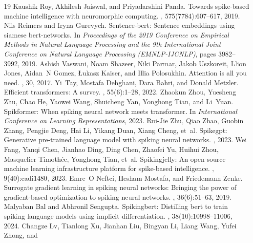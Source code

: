 \documentclass[11pt, conference, compsoc, twoside]{IEEEtran}
\begin{document}
\begin{thebibliography}{19}
Kaushik Roy, Akhilesh Jaiswal, and Priyadarshini Panda.
\newblock Towards spike-based machine intelligence with neuromorphic computing.
, 575(7784):607--617, 2019.
Nils Reimers and Iryna Gurevych.
\newblock Sentence-bert: Sentence embeddings using siamese bert-networks.
\newblock In {\em Proceedings of the 2019 Conference on Empirical Methods in
  Natural Language Processing and the 9th International Joint Conference on
  Natural Language Processing (EMNLP-IJCNLP)}, pages 3982--3992, 2019.
Ashish Vaswani, Noam Shazeer, Niki Parmar, Jakob Uszkoreit, Llion Jones,
  Aidan~N Gomez, {\L}ukasz Kaiser, and Illia Polosukhin.
\newblock Attention is all you need.
, 30, 2017.
Yi~Tay, Mostafa Dehghani, Dara Bahri, and Donald Metzler.
\newblock Efficient transformers: A survey.
, 55(6):1--28, 2022.
Zhaokun Zhou, Yuesheng Zhu, Chao He, Yaowei Wang, Shuicheng Yan, Yonghong Tian,
  and Li~Yuan.
\newblock Spikformer: When spiking neural network meets transformer.
\newblock In {\em International Conference on Learning Representations}, 2023.
Rui-Jie Zhu, Qiao Zhao, Guobin Zhang, Pengjie Deng, Hai Li, Yikang Duan, Xiang
  Cheng, et~al.
\newblock Spikegpt: Generative pre-trained language model with spiking neural
  networks.
, 2023.
Wei Fang, Yanqi Chen, Jianhao Ding, Ding Chen, Zhaofei Yu, Huihui Zhou,
  Masquelier Timoth{\'e}e, Yonghong Tian, et~al.
\newblock Spikingjelly: An open-source machine learning infrastructure platform
  for spike-based intelligence.
, 9(40):eadi1480, 2023.
Emre~O Neftci, Hesham Mostafa, and Friedemann Zenke.
\newblock Surrogate gradient learning in spiking neural networks: Bringing the
  power of gradient-based optimization to spiking neural networks.
, 36(6):51--63, 2019.
Malyaban Bal and Abhronil Sengupta.
\newblock Spikingbert: Distilling bert to train spiking language models using
  implicit differentiation.
,
  38(10):10998--11006, 2024.
Changze Lv, Tianlong Xu, Jianhan Liu, Bingyan Li, Liang Wang, Yufei Zhong, and

\end{thebibliography}
\end{document}
